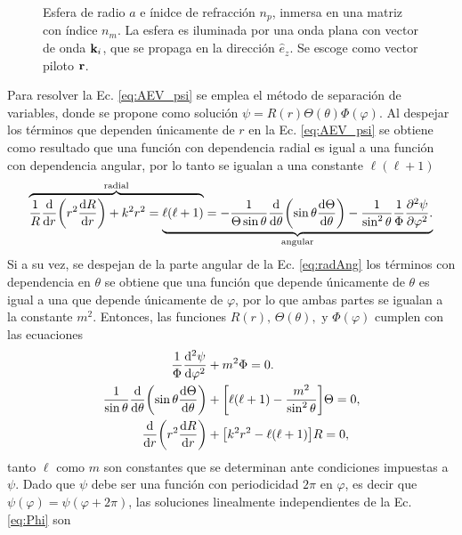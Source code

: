 \begin{figure}[h!]
		\caption{ Esfera de radio $a$ e ínidce de refracción $n_p$, inmersa en una matriz con índice $n_m$. La esfera es iluminada por una onda plana con vector de onda $\vb{k}_i$, que se propaga en la dirección $\hat{e}_z$. Se escoge como vector piloto $\vb{r}$.}\label{fig:EsferaA}
	\end{figure}	
	
Para resolver la Ec. \eqref{eq:AEV_psi} se emplea el método de separación de variables, donde se propone como solución $\psi= R(r)\Theta(\theta) \Phi(\varphi)$. Al despejar los términos que dependen únicamente de $r$ en la Ec. \eqref{eq:AEV_psi} se obtiene como resultado que una función con dependencia radial es igual a una función con dependencia angular, por lo tanto se igualan a una constante $\ell (\ell +1)$
	\begin{align}
\mathrlap{\overbrace{\phantom{\frac{1}{R} \dv{r}\qty(r^2\dv{R}{r})+  k^2 r^2 = \ell (\ell +1)}}^{\text{radial}}}
							 \frac{1}{R} \dv{r}\qty(r^2\dv{R}{r})+  k^2 r^2 = 
\mathrlap{\underbrace{\phantom{\ell (\ell +1)=
											-\frac{1}{\Theta\sin\theta}\dv{\theta}\qty(\sin\theta\dv{\Theta}{\theta})
								 			- \frac{1}{\sin^2\theta}\frac{1}{\Phi}\pdv[2]{\psi}{\varphi}. }}_{\text{angular}}}
						 	\ell (\ell +1)=
											-\frac{1}{\Theta\sin\theta}\dv{\theta}\qty(\sin\theta\dv{\Theta}{\theta})
					 						- \frac{1}{\sin^2\theta}\frac{1}{\Phi}\pdv[2]{\psi}{\varphi}.
					 		\label{eq:radAng}
	\end{align}
Si a su vez, se despejan de la parte angular de la Ec. \eqref{eq:radAng} los términos con dependencia en $\theta$ se obtiene que una función que depende únicamente de $\theta$ es igual a una que depende únicamente de $\varphi$, por lo que ambas partes se igualan a la constante $m^2$. Entonces, las funciones $R(r),\, \Theta(\theta), \mbox{ y } \Phi(\varphi)$ cumplen con las ecuaciones
\begin{align}
\frac{1}{\Phi}\dv[2]{\psi}{\varphi} &+ m^2 \Phi =0. \label{eq:Phi}\\
\frac{1}{\sin\theta}\dv{\theta}\qty(\sin\theta\dv{\Theta}{\theta}) &+ \qty[\ell(\ell+1)- \frac{m^2}{\sin^2\theta}]\Theta =0,\label{eq:Theta}\\
\dv{r}\qty(r^2\dv{R}{r}) &+ \qty[ k^2 r^2 - \ell (\ell +1)] R =0, \label{eq:Req}
\end{align}
tanto $\ell$  como $m$ son constantes que se determinan ante condiciones impuestas a $\psi$. Dado que $\psi$ debe ser una función con periodicidad $2\pi$ en $\varphi$, es decir que $\psi(\varphi) = \psi(\varphi+2\pi)$, las soluciones linealmente independientes de la Ec. \eqref{eq:Phi} son 

